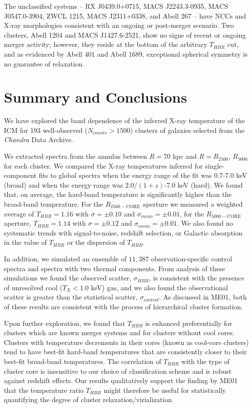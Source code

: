 \documentclass[12pt,preprint]{aastex}
\begin{document}
The unclassified systems -- RX J0439.0+0715, MACS J2243.3-0935, MACS
J0547.0-3904, ZWCL 1215, MACS J2311+0338, and Abell 267 -- have NCCs and
X-ray morphologies consistent with an ongoing or post-merger
scenario. Two clusters, Abell 1204 and MACS J1427.6-2521, show no
signs of recent or ongoing merger activity; however, they reside at
the bottom of the arbitrary $T_{HBR}$ cut, and as evidenced by Abell 401 and
Abell 1689, exceptional spherical symmetry is no guarantee of
relaxation.

\section{Summary and Conclusions}\label{sec:summary}

We have explored the band dependence of the inferred X-ray temperature
of the ICM for 193 well-observed ($N_{counts} > 1500$) clusters of
galaxies selected from the {\it Chandra} Data Archive.

We extracted spectra from the annulus between $R=70$ kpc and
$R=R_{2500}$, $R_{5000}$ for each cluster. We compared the X-ray
temperatures inferred for single-component fits to global spectra
when the energy range of the fit was 0.7-7.0 keV (broad) and when the
energy range was $2.0/(1+z)$-7.0 keV (hard). We found that, on
average, the hard-band temperature is significantly higher than
the broad-band temperature. For the $R_{2500-\mathrm{CORE}}$ aperture we measured a
weighted average of $T_{HBR} = 1.16$ with $\sigma = \pm 0.10$ and
$\sigma_{mean} = \pm 0.01$, for the $R_{5000-\mathrm{CORE}}$ aperture,
$T_{HBR} = 1.14$ with $\sigma = \pm 0.12$ and $\sigma_{mean} = \pm
0.01$. We also found no systematic trends with signal-to-noise,
redshift selection, or Galactic absorption in the value of $T_{HBR}$
or the dispersion of $T_{HBR}$.

In addition, we simulated an ensemble of $11,387$ observation-specific
control spectra and spectra with two thermal components. From analysis
of these simulations we found the observed scatter, $\sigma_{HBR}$, is
consistent with the presence of unresolved cool ($T_X < 1.0$ keV) gas,
and we also found the observational scatter is greater than the
statistical scatter, $\sigma_{control}$. As discussed in ME01, both of
these results are consistent with the process of hierarchical cluster
formation.

Upon further exploration, we found that $T_{HBR}$ is enhanced
preferentially for clusters which are known merger systems and for
clusters without cool cores. Clusters with temperature decrements in
their cores (known as cool-core clusters) tend to have best-fit
hard-band temperatures that are consistently closer to their
best-fit broad-band temperatures. The correlation of $T_{HBR}$ with
the type of cluster core is insensitive to our choice of
classification scheme and is robust against redshift effects. Our
results qualitatively support the finding by ME01 that the temperature
ratio $T_{HBR}$ might therefore be useful for statistically
quantifying the degree of cluster relaxation/virialization.
\end{document}
